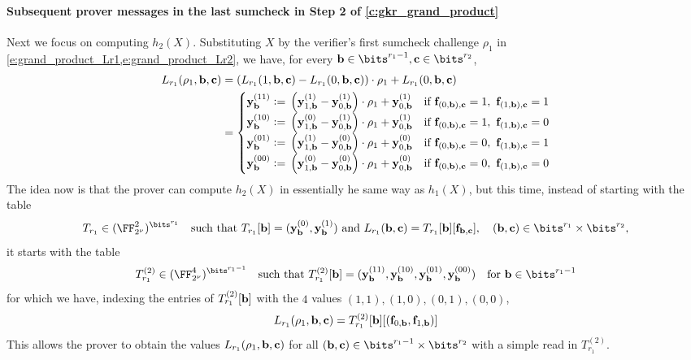 \documentclass[11pt,letterpaper,usenames,dvipsnames]{article}
\begin{document}
\paragraph{Subsequent prover messages in the last sumcheck in Step 2 of \cref{c:gkr_grand_product}} Next we focus on computing $h_2(X)$. Substituting $X$ by the verifier's first sumcheck challenge $\rho_1$ in \cref{e:grand_product_Lr1,e:grand_product_Lr2}, we have, for every $\bb\in \bits^{r_1-1}, \cc\in \bits^{r_2}$, 
%
\begin{align*}
L_{r_1}(\rho_1,\bb, \cc) &   =\left(L_{r_1}( 1, \bb,\cc) -  L_{r_1}( 0, \bb,\cc)\right)\cdot \rho_1 + L_{r_1}( 0, \bb,\cc)\\ &= \begin{cases}
\yy_{\bb}^{(11)}\defeq \left(\yy_{1,\bb}^{(1)} - \yy_{0,\bb}^{(1)}\right)\cdot \rho_1 + \yy_{0,\bb}^{(1)} &\text{if } \bff_{(0,\bb),\cc}=1,\ \bff_{(1,\bb),\cc}=1 \\  
\yy_{\bb}^{(10)}\defeq \left(\yy_{1,\bb}^{(0)} - \yy_{0,\bb}^{(1)}\right)\cdot \rho_1 + \yy_{0,\bb}^{(1)}&\text{if } \bff_{(0,\bb),\cc}=1,\ \bff_{(1,\bb),\cc}=0\\
\yy_{\bb}^{(01)}\defeq 
\left(\yy_{1,\bb}^{(1)} - \yy_{0,\bb}^{(0)}\right)\cdot \rho_1 + \yy_{0,\bb}^{(0)} & \text{if } \bff_{(0,\bb),\cc}=0,\ \bff_{(1,\bb),\cc}=1 \\
    \yy_{\bb}^{(00)}\defeq \left(\yy_{1,\bb}^{(0)} - \yy_{0,\bb}^{(0)}\right)\cdot \rho_1 + \yy_{0,\bb}^{(0)} &\text{if } \bff_{(0,\bb),\cc}=0,\  \bff_{(1,\bb),\cc}=0
\end{cases}
\end{align*}
The idea now is that the prover can compute $h_2(X)$ in essentially  he same way as  $h_1(X)$, but this time, instead of starting with the table $$T_{r_1}\in (\comfield^2)^{\bits^{r_1}} \quad \text{such that } T_{r_1}[\bb]=(\yy_\bb^{(0)}, \yy_{\bb}^{(1)}) \text{ and } L_{r_1}(\bb,\cc) = T_{r_1}[\bb][\ff_{\bb,\cc}], \quad  (\bb,\cc)\in \bits^{r_1}\times \bits^{r_2},$$
it starts with the table
%
$$
T_{r_1}^{(2)} \in (\comfield^4)^{\bits^{r_1-1}} \quad \text{such that } T_{r_1}^{(2)}[\bb] = ( \yy_{\bb}^{(11)}, \yy_{\bb}^{(10)},  \yy_{\bb}^{(01)},\yy_{\bb}^{(00)}) \quad \text{for } \bb\in \bits^{r_1-1}
$$
for which we have, indexing the  entries of  $T_{r_1}^{(2)}[\mathbf{b}]$ with the $4$ values $(1,1), (1,0), (0,1), (0,0)$,
%
$$
L_{r_1}(\rho_1, \mathbf{b},\mathbf{c}) = T_{r_1}^{(2)}[\mathbf{b}][(\mathbf{f}_{0,\mathbf{b}},\mathbf{f}_{1,\mathbf{b}})]
$$
This allows the prover to obtain the values $L_{r_1}(\rho_1,\mathbf{b},\mathbf{c})$ for all $(\bb,\cc)\in \bits^{r_1-1}\times \bits^{r_2}$ with a simple read in $T_{r_1}^{(2)}$.  
\end{document}
